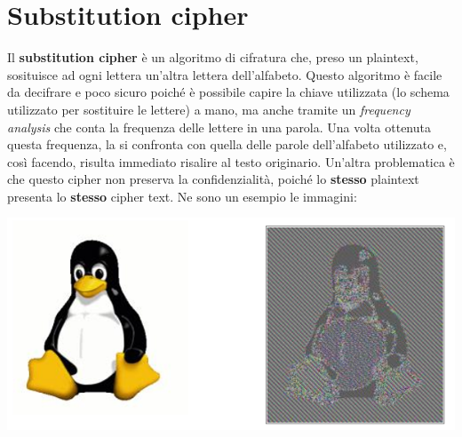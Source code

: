 \documentclass{book}
\theoremstyle{remark}
\begin{document}
\chapter{Substitution cipher} Il \textbf{substitution cipher} è un algoritmo di cifratura che, preso un plaintext, sosituisce ad ogni lettera un'altra lettera dell'alfabeto\@. Questo algoritmo è facile da decifrare e poco sicuro poiché è possibile capire la chiave utilizzata (lo schema utilizzato per sostituire le lettere) a mano, ma anche tramite un \emph{frequency analysis} che conta la frequenza delle lettere in una parola\@. Una volta ottenuta questa frequenza, la si confronta con quella delle parole dell'alfabeto utilizzato e, così facendo, risulta immediato risalire al testo originario\@.
Un'altra problematica è che questo cipher non preserva la confidenzialità, poiché lo \textbf{stesso} plaintext presenta lo \textbf{stesso} cipher text\@. Ne sono un esempio le immagini:
\begin{center}
	\includegraphics[scale=0.3]{substilug}
\end{center}
\end{document}
